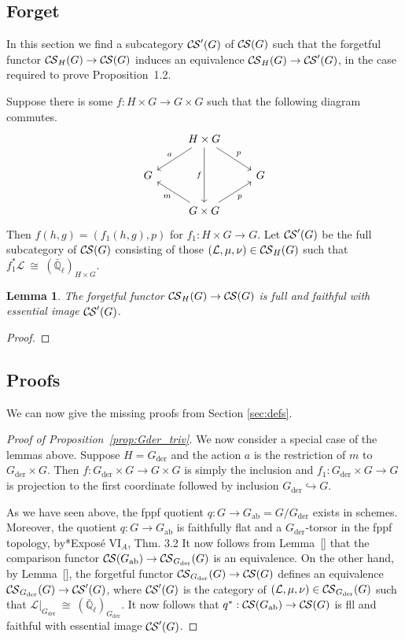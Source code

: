 \documentclass[10pt]{amsart}
\theoremstyle{plain}
\newtheorem{lemma}[theorem]{Lemma}
\theoremstyle{definition}
\newcommand{\EE}{\mathbb{\bar Q}_\ell}
\newcommand{\der}{_{\operatorname{der}}}
\newcommand{\ab}{_{\operatorname{ab}}}
\newcommand{\iso}{{\ \cong\ }}
\newcommand{\cs}[1]{{\mathcal{#1}}}
\newcommand{\CS}{{\mathcal{C\hskip-0.8pt S}}}
\begin{document}
\subsection{Forget}

In this section we find a subcategory $\CS'(G)$ of $\CS(G)$ such that the forgetful functor $\CS_H(G) \to \CS(G)$ induces an equivalence $\CS_H(G) \to \CS'(G)$, in the case required to prove Proposition~1.2.

Suppose there is some $f : H\times G\to G\times G$ such that the following diagram commutes.
\[
\begin{tikzcd}
\ &  \arrow{dl}[swap]{a} H \times G \arrow{dr}{p} \arrow{dd}[swap]{f} & \\
G & & G \\
& \arrow{ul}{m} G \times G \arrow{ur}[swap]{p} & 
\end{tikzcd}
\]
Then $f(h,g) = (f_1(h,g),p)$ for $f_1 : H\times G \to G$.
Let $\CS'(G)$ be the full subcategory of $\CS(G)$ consisting of those $(\cs{L},\mu,\nu) \in \CS_H(G)$ such that $f_1^*\cs{L} \iso (\EE)_{H\times G}$. 

\begin{lemma}
The forgetful functor $\CS_H(G) \to \CS(G)$ is full and faithful with essential image $\CS'(G)$.\end{lemma}

\begin{proof}
\end{proof}

\subsection{Proofs}

We can now give the missing proofs from Section \ref{sec:defs}.

\begin{proof}[Proof of Proposition~\ref{prop:Gder_triv}]
We now consider a special case of the lemmas above. 
Suppose $H = G\der$ and the action $a$ is the restriction of $m$ to $G\der\times G$.
Then $f : G\der \times G\to G\times G$ is simply the inclusion and $f_1: G\der\times G \to G$ is projection to the first coordinate followed by inclusion $G\der \hookrightarrow G$. 

As we have seen above, the fppf quotient $q : G\to G\ab = G/G\der$ exists in schemes.
Moreover, the quotient $q : G \to G\ab$ is faithfully flat and a $G\der$-torsor in the fppf topology, by\cite{SGA3}*{Expos\'e {VI}$_A$, Thm. 3.2}
It now follows from Lemma~[] that the comparison functor $\CS(G\ab)\to \CS_{G\der}(G)$ is an equivalence.
On the other hand, by Lemma~[], the forgetful functor $\CS_{G\der}(G)\to \CS(G)$ defines an equivalence $\CS_{G\der}(G)\to \CS'(G)$, where $\CS'(G)$ is the category of $(\cs{L},\mu,\nu)\in \CS_{G\der}(G)$ such that $\cs{L}\vert_{G\der} \iso (\EE)_{G\der}$.
It now follows that $q^* : \CS(G\ab) \to \CS(G)$ is fll and faithful with essential image $\CS'(G)$.
\end{proof}
\end{document}
